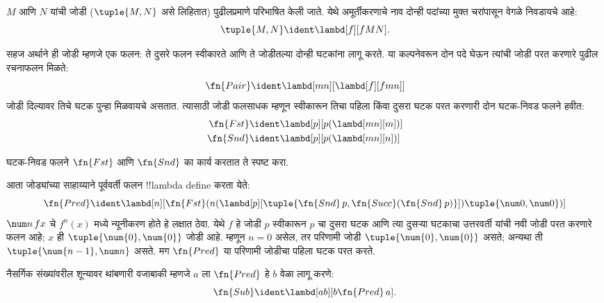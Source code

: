 \documentclass[../../../include/open-logic-section]{subfiles}
\begin{document}

\begin{defn}
$M$ आणि $N$ यांची जोडी ($\tuple{M,N}$ असे लिहितात)
पुढीलप्रमाणे परिभाषित केली जाते. येथे अमूर्तीकरणाचे
नाव दोन्ही पदांच्या मुक्त चरांपासून वेगळे निवडायचे आहे:
\[
\tuple{M,N} \ident \lambd[f][fMN].
\]
\end{defn}

सहज अर्थाने ही जोडी म्हणजे एक फलन: ते दुसरे फलन
स्वीकारते आणि ते जोडीतल्या दोन्ही घटकांना लागू करते.
या कल्पनेवरून दोन पदे घेऊन त्यांची जोडी परत करणारे
पुढील रचनाफलन मिळते:
\[
  \fn{Pair} \ident \lambd[mn][\lambd[f][fmn]]
\]
जोडी दिल्यावर तिचे घटक पुन्हा मिळवायचे असतात.
त्यासाठी जोडी फलसाधक म्हणून स्वीकारून तिचा पहिला
किंवा दुसरा घटक परत करणारी दोन घटक-निवड फलने हवीत:
\begin{align*}
  \fn{Fst} & \ident \lambd[p][p(\lambd[mn][m])]\\
  \fn{Snd} & \ident \lambd[p][p(\lambd[mn][n])]
\end{align*}

\begin{prob}
  घटक-निवड फलने $\fn{Fst}$ आणि $\fn{Snd}$ का कार्य
  करतात ते स्पष्ट करा.
\end{prob}

आता जोड्यांच्या साहाय्याने पूर्ववर्ती फलन
!!{lambda define} करता येते:
\[
  \fn{Pred} \ident \lambd[n][\fn{Fst}(n (\lambd[p][\tuple{\fn{Snd}\, {p}, \fn{Succ}(\fn{Snd}\, {p})}]) \tuple{\num 0, \num 0})]
\]
$\num n\, f x$ चे $f^{n}(x)$ मध्ये न्यूनीकरण
होते हे लक्षात ठेवा. येथे $f$ हे जोडी $p$ स्वीकारून
$p$ चा दुसरा घटक आणि त्या दुसऱ्या घटकाचा
उत्तरवर्ती यांची नवी जोडी परत करणारे फलन आहे;
$x$ ही $\tuple{\num{0},\num{0}}$ जोडी आहे. म्हणून $n=0$
असेल, तर परिणामी जोडी $\tuple{\num{0},\num{0}}$ असते;
अन्यथा ती $\tuple{\num{n-1}, \num n}$ असते.
मग $\fn{Pred}$ या परिणामी जोडीचा पहिला घटक
परत करते.

नैसर्गिक संख्यांवरील शून्यावर थांबणारी वजाबाकी
म्हणजे $a$ ला $\fn{Pred}$ हे $b$ वेळा लागू करणे:
\[
\fn{Sub} \ident \lambd[ab][b \fn{Pred}\, a].
\]
\end{document}
